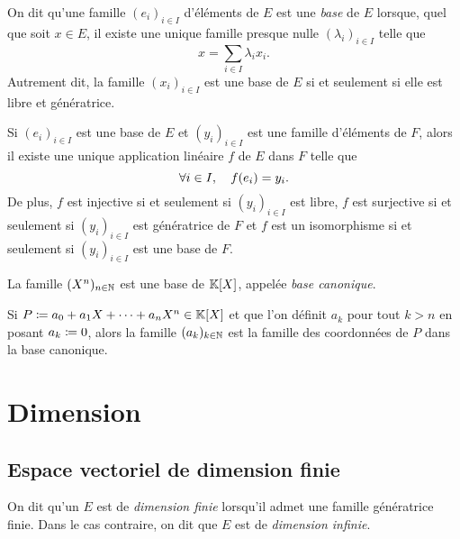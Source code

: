 \documentclass{magnolia}
\begin{document}
\begin{definition}[utile=-3]
On dit qu'une famille $(e_i)_{i\in I}$ d'éléments de $E$ est une \emph{base} de $E$ lorsque, quel que soit $x\in E$, il existe une
unique famille presque nulle $(\lambda_i)_{i\in I}$ telle que
\[x=\sum_{i\in I} \lambda_i x_i.\]
Autrement dit, la famille $(x_i)_{i\in I}$ est une base de $E$ si et seulement si elle est libre et génératrice.
\end{definition}

\begin{remarqueUnique}
\remarque Si $(e_i)_{i\in I}$ est une base de $E$ et $(y_i)_{i\in I}$ est une famille
d'éléments de $F$, alors il existe une unique application linéaire $f$ de $E$ dans $F$ telle que
\[\forall i\in I,\quad f(e_i)=y_i.\]
De plus, $f$ est injective si et seulement si $(y_i)_{i\in I}$ est libre, $f$ est surjective si et seulement si
$(y_i)_{i\in I}$ est génératrice de $F$ et $f$ est un isomorphisme si et seulement si $(y_i)_{i\in I}$ est une base de $F$.
\end{remarqueUnique}


\begin{definition}
La famille $(X^n)_{n\in\mathbb{N}}$ est une base de $\polyK$, appelée \emph{base canonique}.
\end{definition}

\begin{remarqueUnique}
\remarque Si $P\defeq a_0+a_1X+\cdots+a_nX^n\in\polyK$ et que l'on définit $a_k$ pour
  tout $k>n$ en posant $a_k\coloneqq 0$, alors la famille
$(a_k)_{k\in\mathbb{N}}$ est la famille des coordonnées de  $P$ dans la base canonique.
\end{remarqueUnique}

\section{Dimension}

\subsection{Espace vectoriel de dimension finie}
\begin{definition}[utile=-3]
On dit qu'un \Kev $E$ est de \emph{dimension finie} lorsqu'il admet une famille
génératrice finie. Dans le cas contraire, on dit que $E$ est de \emph{dimension
infinie}.
\end{definition}
\end{document}
